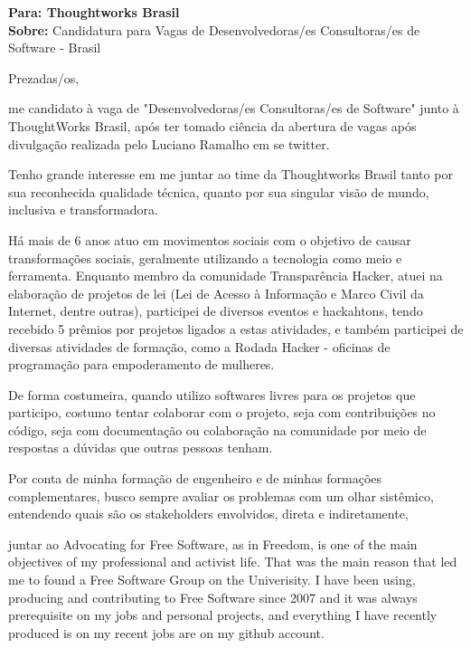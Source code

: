 \documentclass[]{friggeri-cover-letter}
\begin{document}
\thispagestyle{empty}
%
%

\textbf{Para: Thoughtworks Brasil}\\
\textbf{Sobre:} Candidatura para Vagas de Desenvolvedoras/es Consultoras/es de Software - Brasil

\vfill

Prezadas/os,

\vfill

me candidato à vaga de "Desenvolvedoras/es Consultoras/es de Software" junto à ThoughtWorks Brasil, após ter tomado ciência da abertura de vagas após divulgação realizada pelo Luciano Ramalho em se twitter.

Tenho grande interesse em me juntar ao time da Thoughtworks Brasil tanto por sua reconhecida qualidade técnica, quanto por sua singular visão de mundo, inclusiva e transformadora.

Há mais de 6 anos atuo em movimentos sociais com o objetivo de causar transformações sociais, geralmente utilizando a tecnologia como meio e ferramenta. Enquanto membro da comunidade Transparência Hacker, atuei na elaboração de projetos de lei (Lei de Acesso à Informação e Marco Civil da Internet, dentre outras), participei de diversos eventos e hackahtons, tendo recebido 5 prêmios por projetos ligados a estas atividades, e também participei de diversas atividades de formação, como a Rodada Hacker - oficinas de programação para empoderamento de mulheres.

De forma costumeira, quando utilizo softwares livres para os projetos que participo, costumo tentar colaborar com o projeto, seja com contribuições no código, seja com documentação ou colaboração na comunidade por meio de respostas a dúvidas que outras pessoas tenham.

Por conta de minha formação de engenheiro e de minhas formações complementares, busco sempre avaliar os problemas com um olhar sistêmico, entendendo quais são os stakeholders envolvidos, direta e indiretamente, 

juntar ao Advocating for Free Software, as in Freedom, is one of the main objectives of my professional and activist life.
That was the main reason that led me to found a Free Software Group on the Univerisity. I have been using, producing and contributing to Free Software since 2007 and it was always prerequisite on my jobs and personal projects, and everything I have recently produced is on my recent jobs are on my github account.
\end{document}
